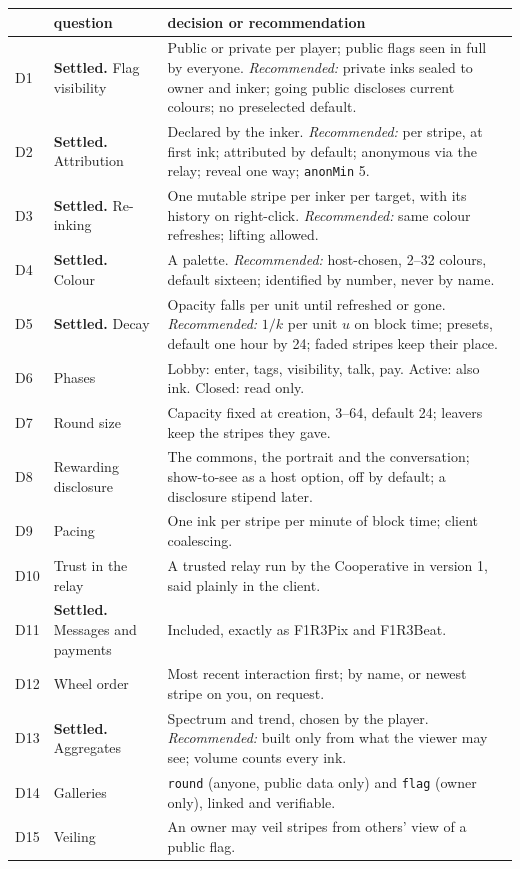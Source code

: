 \documentclass[11pt,a4paper]{article}
\newcommand{\code}[1]{\texttt{#1}}
\newcounter{req}
\begin{document}
\begin{center}\small
\begin{tabularx}{\linewidth}{@{}l>{\raggedright\arraybackslash}p{38mm}X@{}}
\toprule
 & question & decision or recommendation\\
\midrule
D1 & \textbf{Settled.} Flag visibility & Public or private per player; public flags seen in full by everyone. \emph{Recommended:} private inks sealed to owner and inker; going public discloses current colours; no preselected default.\\
D2 & \textbf{Settled.} Attribution & Declared by the inker. \emph{Recommended:} per stripe, at first ink; attributed by default; anonymous via the relay; reveal one way; \code{anonMin} 5.\\
D3 & \textbf{Settled.} Re-inking & One mutable stripe per inker per target, with its history on right-click. \emph{Recommended:} same colour refreshes; lifting allowed.\\
D4 & \textbf{Settled.} Colour & A palette. \emph{Recommended:} host-chosen, 2--32 colours, default sixteen; identified by number, never by name.\\
D5 & \textbf{Settled.} Decay & Opacity falls per unit until refreshed or gone. \emph{Recommended:} $1/k$ per unit $u$ on block time; presets, default one hour by 24; faded stripes keep their place.\\
D6 & Phases & Lobby: enter, tags, visibility, talk, pay. Active: also ink. Closed: read only.\\
D7 & Round size & Capacity fixed at creation, 3--64, default 24; leavers keep the stripes they gave.\\
D8 & Rewarding disclosure & The commons, the portrait and the conversation; show-to-see as a host option, off by default; a disclosure stipend later.\\
D9 & Pacing & One ink per stripe per minute of block time; client coalescing.\\
D10 & Trust in the relay & A trusted relay run by the Cooperative in version 1, said plainly in the client.\\
D11 & \textbf{Settled.} Messages and payments & Included, exactly as F1R3Pix and F1R3Beat.\\
D12 & Wheel order & Most recent interaction first; by name, or newest stripe on you, on request.\\
D13 & \textbf{Settled.} Aggregates & Spectrum and trend, chosen by the player. \emph{Recommended:} built only from what the viewer may see; volume counts every ink.\\
D14 & Galleries & \code{round} (anyone, public data only) and \code{flag} (owner only), linked and verifiable.\\
D15 & Veiling & An owner may veil stripes from others' view of a public flag.\\
\bottomrule
\end{tabularx}
\end{center}
\end{document}
